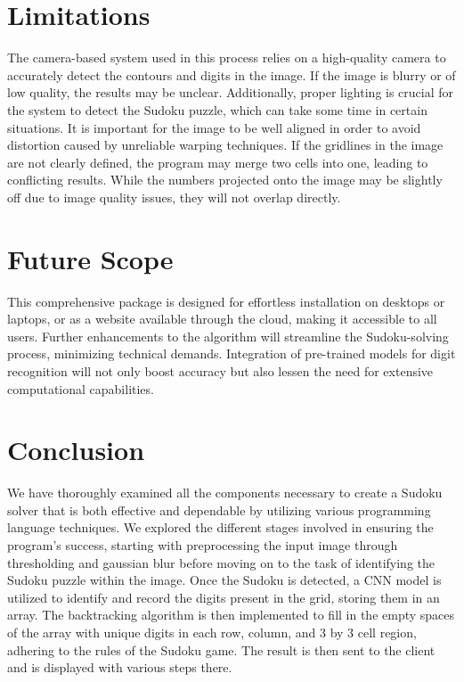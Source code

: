 \documentclass[conference]{IEEEtran}
\begin{document}
\section{Limitations}
The camera-based system used in this process relies on a high-quality camera to accurately detect the contours and digits in the image. If the image is blurry or of low quality, the results may be unclear. Additionally, proper lighting is crucial for the system to detect the Sudoku puzzle, which can take some time in certain situations. It is important for the image to be well aligned in order to avoid distortion caused by unreliable warping techniques. If the gridlines in the image are not clearly defined, the program may merge two cells into one, leading to conflicting results. While the numbers projected onto the image may be slightly off due to image quality issues, they will not overlap directly.

\section{Future Scope}
This comprehensive package is designed for effortless installation on desktops or laptops, or as a website available through the cloud, making it accessible to all users. Further enhancements to the algorithm will streamline the Sudoku-solving process, minimizing technical demands. Integration of pre-trained models for digit recognition will not only boost accuracy but also lessen the need for extensive computational capabilities.

\section{Conclusion}
We have thoroughly examined all the components necessary to create a Sudoku solver that is both effective and dependable by utilizing various programming language techniques. We explored the different stages involved in ensuring the program's success, starting with preprocessing the input image through thresholding and gaussian blur before moving on to the task of identifying the Sudoku puzzle within the image. Once the Sudoku is detected, a CNN model is utilized to identify and record the digits present in the grid, storing them in an array. The backtracking algorithm is then implemented to fill in the empty spaces of the array with unique digits in each row, column, and 3 by 3 cell region, adhering to the rules of the Sudoku game. The result is then sent to the client and is displayed with various steps there.
\end{document}
